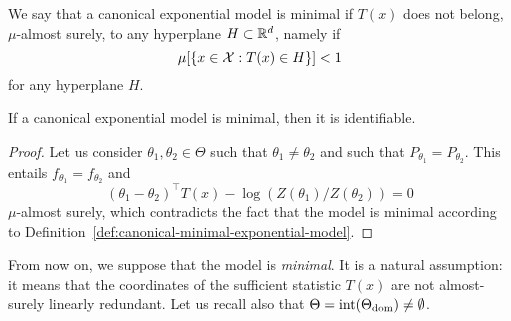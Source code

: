 \begin{definition}
	\label{def:canonical-minimal-exponential-model}
	We say that a canonical exponential model is minimal if $T(x)$ does not belong, $\mu$-almost surely, to any hyperplane $H \subset \mathbb R^d$, namely if 
	\begin{equation*}
		\mu[ \{ x \in \operatorname{{\mathcal X}} : T(x) \in H \}] < 1
	\end{equation*}
	for any hyperplane $H$.
\end{definition}

\begin{proposition}
	If a canonical exponential model is minimal, then it is identifiable.
\end{proposition}

\begin{proof}
Let us consider $\theta_1, \theta_2 \in \Theta$ such that $\theta_1 \neq \theta_2$ and such that $P_{\theta_1} = P_{\theta_2}$.
This entails $f_{\theta_1} = f_{\theta_2}$ and
\begin{equation*}
	(\theta_1 - \theta_2)^\top T(x) - \log (Z(\theta_1) / Z(\theta_2)) = 0
\end{equation*}
 $\mu$-almost surely, which contradicts the fact that the model is minimal according to Definition~\ref{def:canonical-minimal-exponential-model}. \qedhere
\end{proof}

From now on, we suppose that the model is \emph{minimal}.
It is a natural assumption: it means that the coordinates of the sufficient statistic $T(x)$ are not almost-surely linearly redundant.
Let us recall also that $\Theta = \operatorname{int}(\Theta_{\operatorname{dom}}) \neq \emptyset$.

